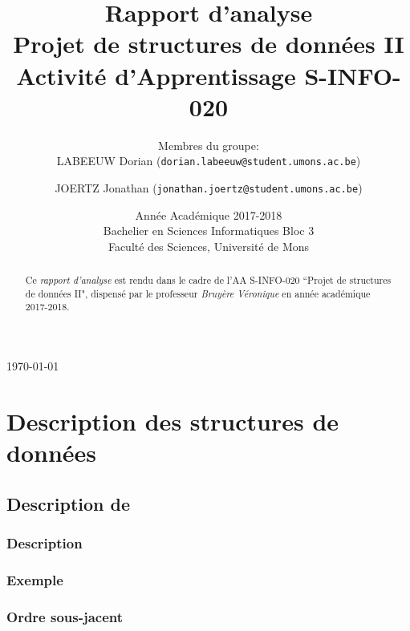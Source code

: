 \documentclass[]{article}
\begin{document}
\title{Rapport d'analyse\\
	Projet de structures de données II\\
	\smallskip
	{\small Activité d'Apprentissage \textsf{S-INFO-020}}\\
}
\author{
Membres du groupe:\\
LABEEUW Dorian (\texttt{dorian.labeeuw@student.umons.ac.be}) \and JOERTZ Jonathan (\texttt{jonathan.joertz@student.umons.ac.be})}

\date{Année Académique 2017-2018\\
Bachelier en Sciences Informatiques Bloc 3\\ 
\vspace{1cm}
Faculté des Sciences, Université de Mons}

\maketitle

\medskip
\begin{center} \today \end{center}
	\begin{abstract}
		Ce \emph{rapport d'analyse} est rendu dans le cadre de l'AA \textsf{S-INFO-020} ``Projet de structures de données II", dispensé par le professeur \emph{Bruyère Véronique} en année académique 2017-2018.
	\end{abstract}

\newpage

\tableofcontents

\newpage

\section{Description des structures de données}\label{sec:mainDesc}
\subsection{Description de }\label{sub:mainQDesc}
\subsubsection{Description}\label{subsub:QDesc}
\subsubsection{Exemple}\label{subsub:QEx}
\subsubsection{Ordre sous-jacent}\label{subsub:QOrd}
\end{document}
